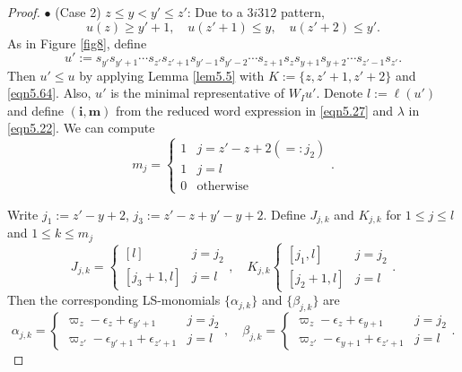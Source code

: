 \documentclass[12pt]{amsart}
\theoremstyle{definition}
\theoremstyle{remark}
\begin{document}
\begin{proof}
$\bullet$ (Case 2) $z \leq y <y' \leq z'$: Due to a $3i312$ pattern,
\begin{equation}\label{eqn5.64}
u(z)\geq y'+1, \quad u(z' +1) \leq y, \quad u(z'+2) \leq y'.
\end{equation}
As in Figure \ref{fig8}, define
\begin{equation}\label{eqn5.27}
u':=s_{y'} s_{y'+1} \cdots s_{z'}s_{z'+1} s_{y'-1} s_{y'-2} \cdots s_{z+1} s_z s_{y+1} s_{y+2} \cdots s_{z'-1} s_{z'}. 
\end{equation}
Then $u' \leq u$ by applying Lemma \ref{lem5.5} with $K:=\{z , z'+1 , z'+2\}$ and \eqref{eqn5.64}. Also, $u'$ is the minimal representative of $W_Iu'$. Denote $l:= \ell (u')$ and define $(\mathbf{i}, \mathbf{m})$ from the reduced word expression in \eqref{eqn5.27} and $\lambda$ in \eqref{eqn5.22}. We can compute
\begin{equation}\label{eqn5.28}
m_j = 
\begin{cases}
1 & j = z'-z+2 (=:j_2) \\
1 & j = l \\
0 & \text{otherwise}
\end{cases}
.
\end{equation}

Write $j_1:= z'-y+2$, $j_3:= z'-z+y'-y+2$. Define $J_{j,k}$ and $K_{j,k}$ for $1\leq j \leq l$ and $1 \leq k \leq m_j$
\begin{equation}\label{eqn5.29}
J_{j,k} = 
\begin{cases}
[l] & j=j_2 \\
[j_3+1,l] & j = l
\end{cases}
, \quad K_{j,k}
\begin{cases}
[j_1,l] & j =j_2 \\
[j_2+1,l] & j =l
\end{cases}
.
\end{equation}
Then the corresponding LS-monomials $\{\alpha_{j,k}\}$ and $\{\beta_{j,k}\}$ are
\begin{equation}\label{eqn5.30}
\alpha_{j,k} = 
\begin{cases}
\varpi_{z}-\epsilon_z+\epsilon_{y'+1} & j = j_2 \\
\varpi_{z'}-\epsilon_{y'+1} + \epsilon_{z'+1} & j=l 
\end{cases}
, \quad \beta_{j,k}=
\begin{cases}
\varpi_{z}-\epsilon_{z} + \epsilon_{y+1} & j = j_2 \\
\varpi_{z'}-\epsilon_{y+1} + \epsilon_{z'+1} & j=l 
\end{cases}
.
\end{equation}


\end{proof}
\end{document}

